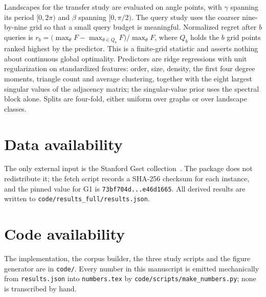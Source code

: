 \documentclass[10pt,letterpaper]{article}
\theoremstyle{definition}
\begin{document}
Landscapes for the transfer study are evaluated on \AnglePoints{} angle points,
with $\gamma$ spanning its period $[0,2\pi)$ and $\beta$ spanning $[0,\pi/2)$.
The query study uses the coarser nine-by-nine grid so that a small query budget
is meaningful. Normalized regret after $b$ queries is
$r_b=\bigl(\max_\theta F-\max_{\theta\in Q_b}F\bigr)/\max_\theta F$, where
$Q_b$ holds the $b$ grid points ranked highest by the predictor. This is a
finite-grid statistic and asserts nothing about continuous global optimality.
Predictors are ridge regressions with unit regularization on standardized
features: order, size, density, the first four degree moments, triangle count
and average clustering, together with the eight largest singular values of the
adjacency matrix; the singular-value prior uses the spectral block alone.
Splits are four-fold, either uniform over graphs or over landscape classes.

\section*{Data availability}

The only external input is the Stanford Gset collection~\cite{gset}. The
package does not redistribute it; the fetch script records a SHA-256 checksum
for each instance, and the pinned value for G1 is
\texttt{73bf704d...e46d1665}. All derived results are written to
\texttt{code/results\_full/results.json}.

\section*{Code availability}

The implementation, the corpus builder, the three study scripts and the figure
generator are in \texttt{code/}. Every number in this manuscript is emitted
mechanically from \texttt{results.json} into \texttt{numbers.tex} by
\texttt{code/scripts/make\_numbers.py}; none is transcribed by hand.



\end{document}
